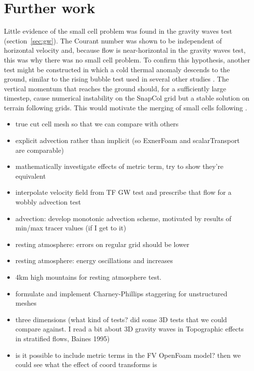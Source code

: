 \chapter{Further work}

Little evidence of the small cell problem was found in the gravity waves test (section~\ref{sec:gw}).  The Courant number was shown to be independent of horizontal velocity and, because flow is near-horizontal in the gravity waves test, this was why there was no small cell problem.  To confirm this hypothesis, another test might be constructed in which a cold thermal anomaly descends to the ground, similar to the rising bubble test used in several other studies \parencites{bonaventura2000}{jebens2011}{good2013}.  The vertical momentum that reaches the ground should, for a sufficiently large timestep, cause numerical instability on the SnapCol grid but a stable solution on terrain following grids.  This would motivate the merging of small cells following \textcite{yamazaki-satomura2010}.

\begin{itemize}
\item true cut cell mesh so that we can compare with others
\item explicit advection rather than implicit (so ExnerFoam and scalarTransport are comparable)
\item mathematically investigate effects of metric term, try to show they're equivalent
\item interpolate velocity field from TF GW test and prescribe that flow for a wobbly advection test
\item advection: develop monotonic advection scheme, motivated by results of min/max tracer values (if I get to it)
\item resting atmosphere: errors on regular grid should be lower
\item resting atmosphere: energy oscillations and increases
\item 4km high mountains for resting atmosphere test.
\item formulate and implement Charney-Phillips staggering for unstructured meshes
\item three dimensions (what kind of tests?  \textcite{lock2012} did some 3D tests that we could compare against.  I read a bit about 3D gravity waves in Topographic effects in stratified flows, Baines 1995) 
\item is it possible to include metric terms in the FV OpenFoam model?  then we could see what the effect of coord transforms is
\end{itemize}
